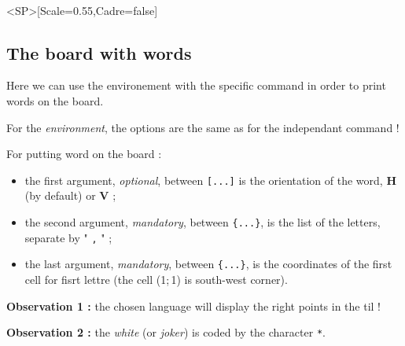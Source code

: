 \documentclass{article}
\newcommand\Cle[1]{{\bfseries\sffamily\textlangle #1\textrangle}}
\begin{document}
\begin{PresentationCode}{}
\ScrabbleBoard[Labels=false,Scale=0.55]\\      %
\ScrabbleBoard<SP>[Scale=0.55,Cadre=false]     %
\end{PresentationCode}

\newpage

\subsection{The board with words}

Here we can use the \textsf{environement} with the specific \textsf{command} in order to print words on the board.

\smallskip

For the \textit{environment}, the options are the same as for the independant \textsf{command} !

\smallskip

For putting word on the board :

\begin{itemize}
	\item the first argument, \textit{optional}, between \texttt{[...]} is the orientation of the word, \Cle{H} (by default) or \Cle{V} ;
	\item the second argument, \textit{mandatory}, between \texttt{\{...\}}, is the list of the letters, separate by " \texttt{,} " ;
	\item the last argument, \textit{mandatory}, between \texttt{\{...\}}, is the coordinates of the first cell for fisrt lettre (the cell (1;\,1) is south-west corner).
\end{itemize}

\textbf{Observation 1 :} the chosen language will display the right points in the til !

\smallskip

\textbf{Observation 2 :} the \textit{white} (or \textit{joker}) is coded by the character \texttt{*}.

\begin{PresentationCode}{}
\begin{EnvScrabble}[Scale=0.75,Labels=false,Help]
\end{EnvScrabble}
\end{PresentationCode}
\end{document}
